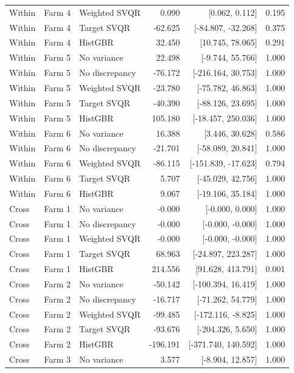{\begin{longtable}{lllrrr}
Within & Farm 4 & Weighted SVQR & 0.090 & [0.062, 0.112] & 0.195 \\
Within & Farm 4 & Target SVQR & -62.625 & [-84.807, -32.268] & 0.375 \\
Within & Farm 4 & HistGBR & 32.450 & [10.745, 78.065] & 0.291 \\
Within & Farm 5 & No variance & 22.498 & [-9.744, 55.766] & 1.000 \\
Within & Farm 5 & No discrepancy & -76.172 & [-216.164, 30.753] & 1.000 \\
Within & Farm 5 & Weighted SVQR & -23.780 & [-75.782, 46.863] & 1.000 \\
Within & Farm 5 & Target SVQR & -40.390 & [-88.126, 23.695] & 1.000 \\
Within & Farm 5 & HistGBR & 105.180 & [-18.457, 250.036] & 1.000 \\
Within & Farm 6 & No variance & 16.388 & [3.446, 30.628] & 0.586 \\
Within & Farm 6 & No discrepancy & -21.701 & [-58.089, 20.841] & 1.000 \\
Within & Farm 6 & Weighted SVQR & -86.115 & [-151.839, -17.623] & 0.794 \\
Within & Farm 6 & Target SVQR & 5.707 & [-45.029, 42.756] & 1.000 \\
Within & Farm 6 & HistGBR & 9.067 & [-19.106, 35.184] & 1.000 \\
Cross & Farm 1 & No variance & -0.000 & [-0.000, 0.000] & 1.000 \\
Cross & Farm 1 & No discrepancy & -0.000 & [-0.000, -0.000] & 1.000 \\
Cross & Farm 1 & Weighted SVQR & -0.000 & [-0.000, -0.000] & 1.000 \\
Cross & Farm 1 & Target SVQR & 68.963 & [-24.897, 223.287] & 1.000 \\
Cross & Farm 1 & HistGBR & 214.556 & [91.628, 413.791] & 0.001 \\
Cross & Farm 2 & No variance & -50.142 & [-100.394, 16.419] & 1.000 \\
Cross & Farm 2 & No discrepancy & -16.717 & [-71.262, 54.779] & 1.000 \\
Cross & Farm 2 & Weighted SVQR & -99.485 & [-172.116, -8.825] & 1.000 \\
Cross & Farm 2 & Target SVQR & -93.676 & [-204.326, 5.650] & 1.000 \\
Cross & Farm 2 & HistGBR & -196.191 & [-371.740, 140.592] & 1.000 \\
Cross & Farm 3 & No variance & 3.577 & [-8.904, 12.857] & 1.000 \\

\end{longtable}}
